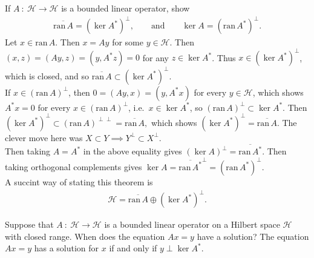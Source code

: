 \documentclass[avery5388,grid,frame]{flashcards}
\newcommand{\ran}{\mathrm{ran}\,}
\newcommand{\f}[3]{#1\ :\ #2 \rightarrow #3}
\def\hilb{\mathcal{H}}
\begin{document}
\begin{flashcard}
    {If $\f{A}{\hilb}{\hilb}$ is a bounded linear operator, show
    \begin{align*}
        \overline{\ran A} = (\ker A^*)^\perp, \qquad \text{and} \qquad \ker A = (\ran A^*)^\perp.
    \end{align*}}
    Let $x \in \ran A$.  Then $x = Ay$ for some $y \in \hilb$.  Then $(x,z) = (Ay,z) = (y, A^*z) = 0$ for any $z \in \ker A^*$.  Thus $x \in (\ker A^*)^\perp$, which is closed, and so $\overline{\ran A} \subset (\ker A^*)^\perp$. \\

    If $x \in (\ran A)^\perp$, then $0 = (Ay,x) = (y,A^*x)$ for every $y \in \hilb$, which shows $A^* x = 0$ for every $x \in (\ran A)^\perp$, i.e.~$x \in \ker A^*$, so $(\ran A)^\perp \subset \ker A^*$.  Then $(\ker A^*)^\perp \subset (\ran A)^{\perp\perp} = \overline{\ran A},$ which shows $(\ker A^*)^\perp = \overline{\ran A}$.  The clever move here was $X \subset Y \implies Y^\perp \subset X^\perp$. \\

    Then taking $A = A^*$ in the above equality gives $(\ker A)^\perp = \overline{\ran A^*}$.  Then taking orthogonal complements gives $\ker A = \overline{\ran A^*}^\perp = (\ran A^*)^\perp$. \\

    A succint way of stating this theorem is
    \begin{align*}
        \hilb = \overline{\ran A} \oplus (\ker A^*)^\perp.
    \end{align*}
\end{flashcard}

\begin{flashcard}
    {Suppose that $\f{A}{\hilb}{\hilb}$ is a bounded linear operator on a Hilbert space $\hilb$ with closed range.  When does the equation $Ax = y$ have a solution?}
    The equation $Ax = y$ has a solution for $x$ if and only if $y \perp \ker A^*$.
\end{flashcard}
\end{document}
